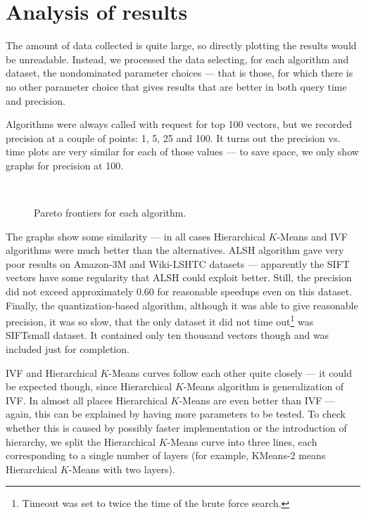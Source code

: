 \section{Analysis of results}

The amount of data collected is quite large, so directly plotting the results would be
unreadable. Instead, we processed the data selecting, for each algorithm and dataset,
the nondominated parameter choices --- that is those, for which there is no other
parameter choice that gives results that are better in both query time and precision.

Algorithms were always called with request for top 100 vectors, but we recorded
precision at a couple of points: 1, 5, 25 and 100. It turns out the precision vs. time
plots are very similar for each of those values --- to save space, we only show
graphs for precision at 100.

\begin{figure}
	\centering
	\\
\caption{Pareto frontiers for each algorithm.}
\end{figure}

The graphs show some similarity --- in all cases Hierarchical $K$-Means and IVF algorithms were much better
than the alternatives. ALSH algorithm gave very poor results on Amazon-3M and Wiki-LSHTC
datasets --- apparently the SIFT vectors have some regularity that ALSH could exploit better.
Still, the precision did not exceed approximately $0.60$ for reasonable speedups even on
this dataset. Finally, the quantization-based algorithm, although it was able to give
reasonable precision, it was so slow, that the only dataset it did not time 
out\footnote{Timeout was set to twice the time of the brute force search.}
was SIFTsmall dataset. It contained only ten thousand vectors though and was included
just for completion.

IVF and Hierarchical $K$-Means curves follow each other quite closely --- it could be expected though,
since Hierarchical $K$-Means algorithm is generalization of IVF. In almost all places Hierarchical $K$-Means are even
better than IVF --- again, this can be explained by having more parameters to be tested.
To check whether this is caused by possibly faster implementation or the introduction of
hierarchy, we split the Hierarchical $K$-Means curve into three lines, each corresponding to a single
number of layers (for example, KMeans-2 means Hierarchical $K$-Means with two layers).

